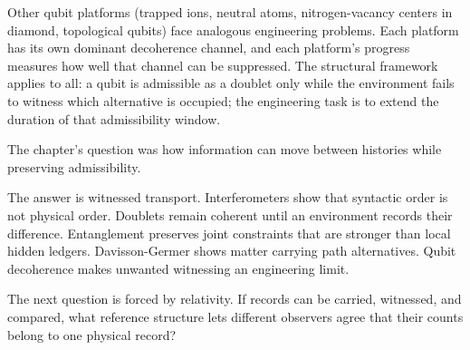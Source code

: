Other qubit platforms (trapped ions, neutral atoms, nitrogen-vacancy
centers in diamond, topological qubits) face analogous engineering
problems. Each platform has its own dominant decoherence channel, and
each platform's progress measures how well that channel can be
suppressed. The structural framework applies to all: a qubit is
admissible as a doublet only while the environment fails to witness
which alternative is occupied; the engineering task is to extend the
duration of that admissibility window.

\begin{bridge}

The chapter's question was how information can move between histories while
preserving admissibility.

The answer is witnessed transport. Interferometers show that syntactic order is
not physical order. Doublets remain coherent until an environment records their
difference. Entanglement preserves joint constraints that are stronger than
local hidden ledgers. Davisson-Germer shows matter carrying path alternatives.
Qubit decoherence makes unwanted witnessing an engineering limit.

The next question is forced by relativity. If records can be carried, witnessed,
and compared, what reference structure lets different observers agree that
their counts belong to one physical record?

\end{bridge}

